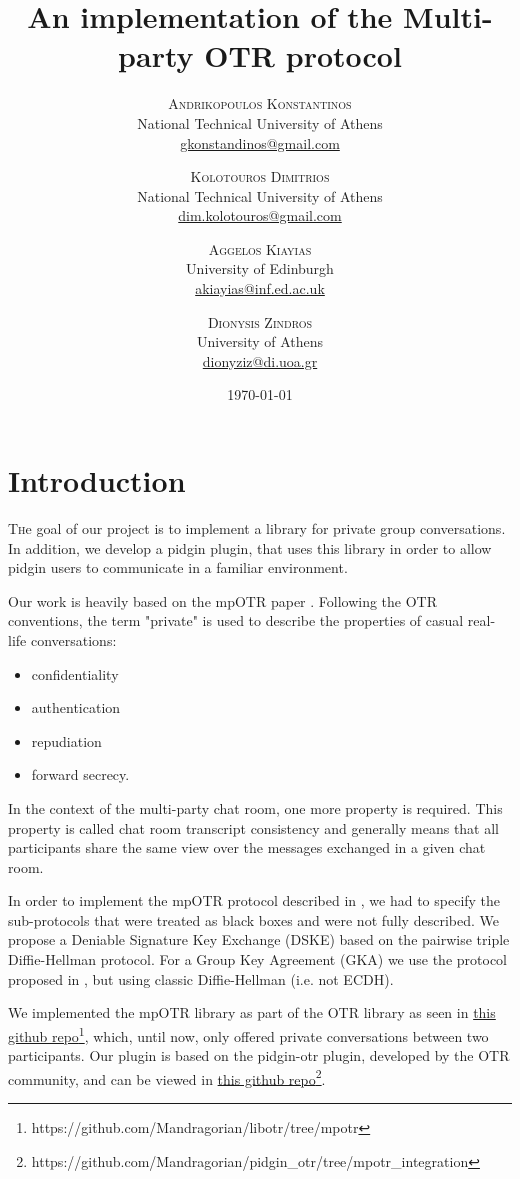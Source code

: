 \documentclass[]{article}
\title{An implementation of the Multi-party OTR protocol} %
\author{%
\textsc{Andrikopoulos Konstantinos}\\[1ex] %
\normalsize National Technical University of Athens \\ %
\normalsize \href{mailto:gkonstandinos@gmail.com}{gkonstandinos@gmail.com} %
\and %
\textsc{Kolotouros Dimitrios} \\[1ex] %
\normalsize National Technical University of Athens \\ %
\normalsize \href{dim.kolotouros@gmail.com}{dim.kolotouros@gmail.com}  %
\and %
\textsc{Aggelos Kiayias} \\[1ex] %
\normalsize University of Edinburgh \\ %
\normalsize \href{mailto:akiayias@inf.ed.ac.uk}{akiayias@inf.ed.ac.uk} \\[1ex]%
\and%
\textsc{Dionysis Zindros} \\[1ex] %
\normalsize University of Athens \\ %
\normalsize \href{mailto:dionyziz@di.uoa.gr}{dionyziz@di.uoa.gr} %
}
\date{\today} %
\begin{document}
\maketitle


\section{Introduction}

\lettrine[nindent=0em,lines=3]{T}he goal of our project is to implement a library for private group conversations.
In addition, we develop a pidgin plugin, that uses this library in order to allow pidgin users to communicate in a familiar environment.

Our work is heavily based on the mpOTR paper \cite{mpotr}.
Following the OTR conventions, the term "private" is used to describe the properties of casual real-life conversations:

\begin{itemize}
  \item confidentiality
  \item authentication
  \item repudiation
  \item forward secrecy.
\end{itemize}

In the context of the multi-party chat room, one more property is required.
This property is called chat room transcript consistency and generally means that all participants share the same view over the messages  exchanged in a given chat room.

In order to implement the mpOTR protocol described in \cite{mpotr}, we had to specify the sub-protocols that were treated as black boxes and were not fully described.
We propose a Deniable Signature Key Exchange (DSKE) based on the pairwise triple Diffie-Hellman protocol.
For a Group Key Agreement (GKA) we use the protocol proposed in \cite{mpenc}, but using classic Diffie-Hellman (i.e. not ECDH).

We implemented the mpOTR library as part of the OTR library as seen in \href{https://github.com/Mandragorian/libotr/tree/mpotr}{this github repo\footnote{https://github.com/Mandragorian/libotr/tree/mpotr}}, which, until now, only offered private conversations between two participants.
Our plugin is based on the pidgin-otr plugin, developed by the OTR community, and can be viewed in \href{https://github.com/Mandragorian/pidgin_otr/tree/mpotr_integration}{this github repo\footnote{https://github.com/Mandragorian/pidgin\_otr/tree/mpotr\_integration}}.
\end{document}
